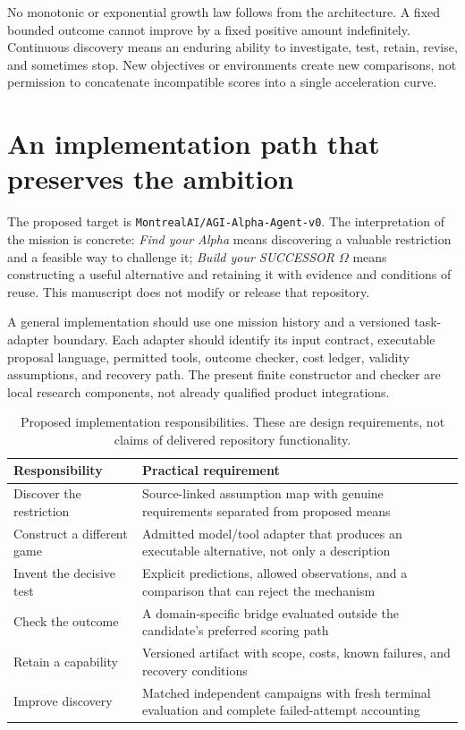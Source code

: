\documentclass[11pt,letterpaper]{article}
\theoremstyle{remark}\newtheorem{remark}{Remark}[section]
\begin{document}
No monotonic or exponential growth law follows from the architecture. A fixed bounded outcome cannot improve by a fixed positive amount indefinitely. Continuous discovery means an enduring ability to investigate, test, retain, revise, and sometimes stop. New objectives or environments create new comparisons, not permission to concatenate incompatible scores into a single acceleration curve.

\section{An implementation path that preserves the ambition}\label{sec:implementation}
The proposed target is \texttt{MontrealAI/AGI-Alpha-Agent-v0}. The interpretation of the mission is concrete: \emph{Find your Alpha} means discovering a valuable restriction and a feasible way to challenge it; \emph{Build your SUCCESSOR $\Omega$} means constructing a useful alternative and retaining it with evidence and conditions of reuse. This manuscript does not modify or release that repository.

A general implementation should use one mission history and a versioned task-adapter boundary. Each adapter should identify its input contract, executable proposal language, permitted tools, outcome checker, cost ledger, validity assumptions, and recovery path. The present finite constructor and checker are local research components, not already qualified product integrations.

\begin{table}[htbp]
\centering\small
\caption{Proposed implementation responsibilities. These are design requirements, not claims of delivered repository functionality.}
\begin{tabularx}{\linewidth}{@{}P{.24\linewidth}Y@{}}
\toprule
Responsibility & Practical requirement\\
\midrule
Discover the restriction & Source-linked assumption map with genuine requirements separated from proposed means\\
Construct a different game & Admitted model/tool adapter that produces an executable alternative, not only a description\\
Invent the decisive test & Explicit predictions, allowed observations, and a comparison that can reject the mechanism\\
Check the outcome & A domain-specific bridge evaluated outside the candidate's preferred scoring path\\
Retain a capability & Versioned artifact with scope, costs, known failures, and recovery conditions\\
Improve discovery & Matched independent campaigns with fresh terminal evaluation and complete failed-attempt accounting\\
\bottomrule
\end{tabularx}
\end{table}
\end{document}
